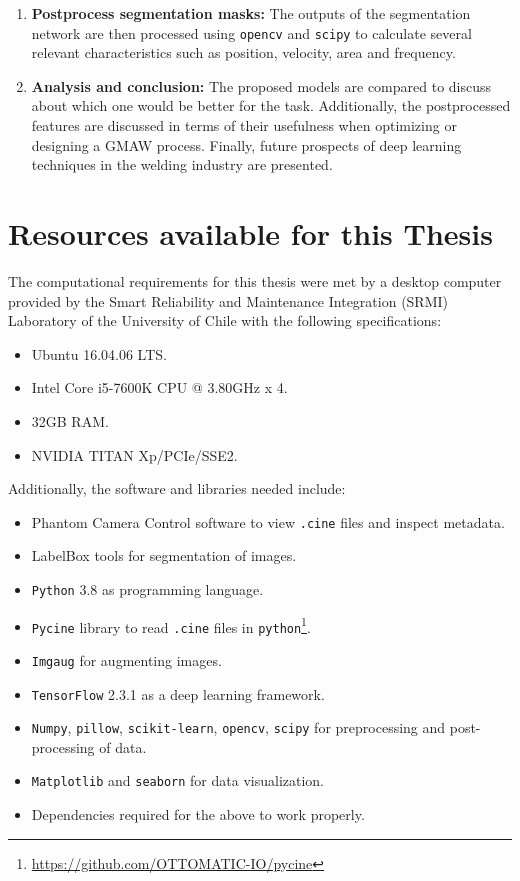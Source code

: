 \begin{enumerate}
    \item \textbf{Postprocess segmentation masks:}
    The outputs of the segmentation network are then processed using \texttt{opencv} and \texttt{scipy} to calculate several relevant characteristics such as position, velocity, area and frequency.\\
    
    \item \textbf{Analysis and conclusion:}
    The proposed models are compared to discuss about which one would be better for the task. Additionally, the postprocessed features are discussed in terms of their usefulness when optimizing or designing a GMAW process. Finally, future prospects of deep learning techniques in the welding industry are presented.
    
\end{enumerate}

\section{Resources available for this Thesis}
The computational requirements for this thesis were met by a desktop computer provided by the Smart Reliability and Maintenance Integration (SRMI) Laboratory of the University of Chile with the following specifications:
\begin{itemize}
    \item Ubuntu 16.04.06 LTS.
    \item Intel Core i5-7600K CPU @ 3.80GHz x 4. 
    \item 32GB RAM.
    \item NVIDIA TITAN Xp/PCIe/SSE2.
\end{itemize}

Additionally, the software and libraries needed include:
\begin{itemize}
    \item Phantom Camera Control software to view \texttt{.cine} files and inspect metadata.
     \item LabelBox tools for segmentation of images.
    \item \texttt{Python} 3.8 as programming language.
    \item \texttt{Pycine} library to read \texttt{.cine} files in \texttt{python}\footnote{\url{https://github.com/OTTOMATIC-IO/pycine}}.
    \item \texttt{Imgaug} for augmenting images.
    \item \texttt{TensorFlow} 2.3.1 as a deep learning framework.
    \item \texttt{Numpy}, \texttt{pillow}, \texttt{scikit-learn}, \texttt{opencv}, \texttt{scipy} for preprocessing and post-processing of data.
    \item \texttt{Matplotlib} and \texttt{seaborn} for data visualization.
    \item Dependencies required for the above to work properly.
\end{itemize}

